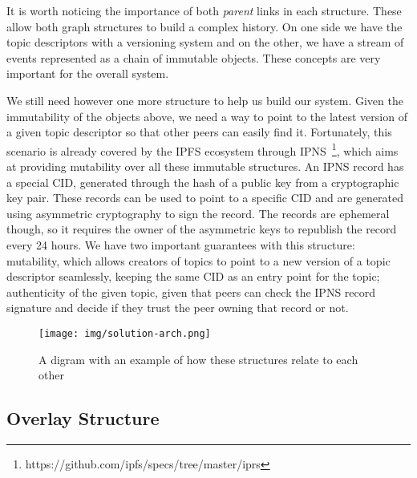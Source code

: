 It is worth noticing the importance of both \emph{parent} links in each
structure. These allow both graph structures to build a complex history.
On one side we have the topic descriptors with a versioning system and
on the other, we have a stream of events represented as a chain of
immutable objects. These concepts are very important for the overall
system.

We still need however one more structure to help us build our system.
Given the immutability of the objects above, we need a way to point to
the latest version of a given topic descriptor so that other peers can
easily find it. Fortunately, this scenario is already covered by the
IPFS ecosystem through IPNS~\footnote{https://github.com/ipfs/specs/tree/master/iprs}, which aims at
providing mutability over all these immutable structures. An IPNS record
has a special CID, generated through the hash of a public key from a
cryptographic key pair. These records can be used to point to a specific
CID and are generated using asymmetric cryptography to sign the record.
The records are ephemeral though, so it requires the owner of the
asymmetric keys to republish the record every 24 hours. We have two
important guarantees with this structure: mutability, which allows
creators of topics to point to a new version of a topic descriptor
seamlessly, keeping the same CID as an entry point for the topic;
authenticity of the given topic, given that peers can check the IPNS
record signature and decide if they trust the peer owning that record or
not.

\begin{figure}[hb!]
  \centering
  \texttt{[image: img/solution-arch.png]}
  \caption{A digram with an example of how these structures relate to each other}
  \label{fig:solution-arch}
\end{figure}

\subsection{Overlay Structure}\label{overlay-structure-solution}

